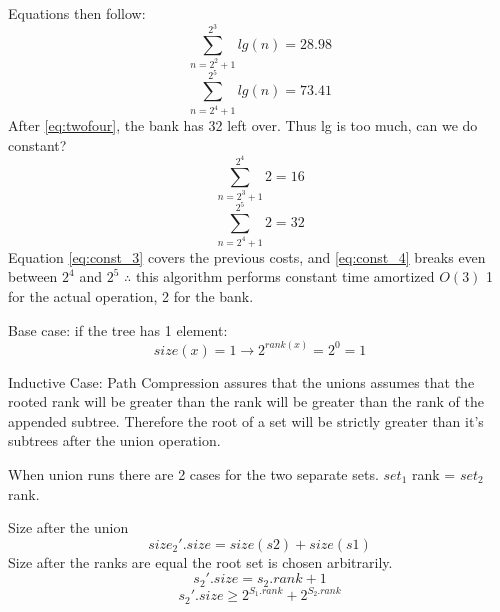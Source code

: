 \documentclass[12pt]{article}
\newenvironment{problem}[2][Problem]{\begin{trivlist}
\item[\hskip \labelsep {\bfseries #1}\hskip \labelsep {\bfseries #2.}]}{\end{trivlist}}
\begin{document}
\begin{problem}{1}
    Equations then follow:
    \begin{equation}
        \displaystyle\sum\limits_{n=2^2+1}^{2^3} lg(n) = 28.98
    \end{equation}
    \begin{equation}
       \label{eq:twofour}
        \displaystyle\sum\limits_{n=2^4+1}^{2^5} lg(n) = 73.41
    \end{equation}
    After \ref{eq:twofour}, the bank has 32 left over. Thus lg is too much, can we
    do constant?
    \begin{equation}
       \label{eq:const_3}
        \displaystyle\sum\limits_{n=2^3+1}^{2^4} 2 = 16
    \end{equation}
    \begin{equation}
       \label{eq:const_4}
        \displaystyle\sum\limits_{n=2^4+1}^{2^5} 2 = 32
    \end{equation}
    Equation \ref{eq:const_3} covers the previous costs, and \ref{eq:const_4} breaks
even between $2^4$ and $2^5$ $\therefore$ this algorithm performs constant time
amortized $O(3)$ 1 for the actual operation, 2 for the bank.
\end{problem}
\begin{problem}{2}

\end{problem}
\begin{problem}{3}
    Base case: if the tree has 1 element:
    \begin{equation}
        size(x) = 1 \rightarrow 2^{rank(x)} = 2^0 = 1
    \end{equation}

    Inductive Case:
    Path Compression assures that the unions assumes that the rooted rank will be
    greater than the rank will be greater than the rank of the appended subtree.
    Therefore the root of a set will be strictly greater than it's subtrees
    after the union operation.

    When union runs there are 2 cases for the two separate sets. $set_1$ rank
    = $set_2$ rank.

    Size after the union 
    \begin{equation}
        size_2'.size = size(s2) + size(s1)
    \end{equation}
    Size after the ranks are equal the root set is chosen arbitrarily.
    \begin{equation}
        s_2'.size = s_2.rank + 1
    \end{equation}
    \begin{equation}
        s_2'.size \ge 2^{S_1.rank} + 2^{S_2.rank}
    \end{equation}
\end{problem}
\end{document}
